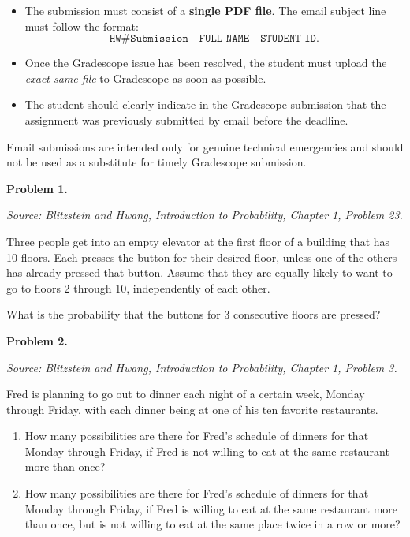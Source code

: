\documentclass[11pt]{article}
\newcommand{\source}[1]{%
    \vspace{0.15cm}
    {\small\textit{Source: Blitzstein and Hwang, \textit{Introduction to Probability}, Chapter 1, Problem #1.}}
}
\begin{document}
\begin{itemize}[leftmargin=*]
    \item The submission must consist of a \textbf{single PDF file}. The email subject line must follow the format:
    \[
    \texttt{HW\# Submission - FULL NAME - STUDENT ID}.
    \]
    \item Once the Gradescope issue has been resolved, the student must upload the \emph{exact same file} to Gradescope as soon as possible.
    \item The student should clearly indicate in the Gradescope submission that the assignment was previously submitted by email before the deadline.
\end{itemize}

Email submissions are intended only for genuine technical emergencies and should not be used as a substitute for timely Gradescope submission.

\newpage


\begin{problemheader}
\textbf{Problem 1.} \hfill 
\end{problemheader}
\source{23}

Three people get into an empty elevator at the first floor of a building that has 10 floors. Each presses the button for their desired floor, unless one of the others has already pressed that button. Assume that they are equally likely to want to go to floors 2 through 10, independently of each other.

What is the probability that the buttons for 3 consecutive floors are pressed?

\vfill
 
\newpage


\begin{problemheader}
\textbf{Problem 2. } \hfill  
\end{problemheader}
\source{3}

Fred is planning to go out to dinner each night of a certain week, Monday through Friday, with each dinner being at one of his ten favorite restaurants.

\begin{enumerate}[label=(\alph*), leftmargin=*]
    \item How many possibilities are there for Fred's schedule of dinners for that Monday through Friday, if Fred is not willing to eat at the same restaurant more than once?

    \item How many possibilities are there for Fred's schedule of dinners for that Monday through Friday, if Fred is willing to eat at the same restaurant more than once, but is not willing to eat at the same place twice in a row or more?
\end{enumerate}
\end{document}
